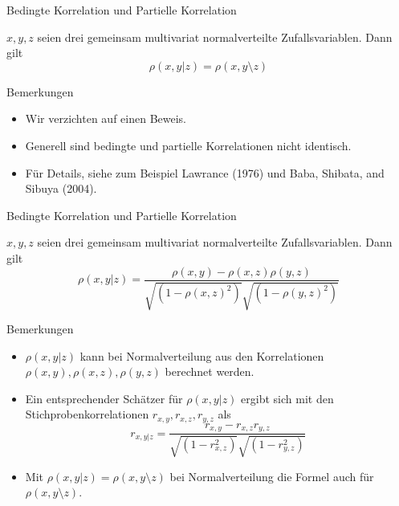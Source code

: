 \documentclass[
  8pt,
  ignorenonframetext,
]{beamer}
\providecommand{\tightlist}{%
  \setlength{\itemsep}{0pt}\setlength{\parskip}{0pt}}
\begin{document}
\begin{frame}{Bedingte Korrelation und Partielle Korrelation}
\protect\hypertarget{bedingte-korrelation-und-partielle-korrelation-8}{}
\small
\begin{theorem}
\justifying
\normalfont
$x,y,z$ seien drei gemeinsam multivariat normalverteilte Zufallsvariablen. Dann gilt
\begin{equation}
\rho(x,y|z) = \rho(x,y \setminus z)
\end{equation}
\end{theorem}
\footnotesize

Bemerkungen

\begin{itemize}
\tightlist
\item
  Wir verzichten auf einen Beweis.
\item
  Generell sind bedingte und partielle Korrelationen nicht identisch.
\item
  Für Details, siehe zum Beispiel Lawrance (1976) und Baba, Shibata, and
  Sibuya (2004).
\end{itemize}
\end{frame}

\begin{frame}{Bedingte Korrelation und Partielle Korrelation}
\protect\hypertarget{bedingte-korrelation-und-partielle-korrelation-9}{}
\small
\begin{theorem}
\justifying
\normalfont
$x,y,z$ seien drei gemeinsam multivariat normalverteilte Zufallsvariablen. Dann gilt
\begin{equation}
\rho(x,y|z) = \frac{\rho(x,y) - \rho(x,z)\rho(y,z)}{\sqrt{\left(1 - \rho(x,z)^2\right)}\sqrt{\left(1 - \rho(y,z)^2\right)}}
\end{equation}
\end{theorem}

\footnotesize

Bemerkungen

\begin{itemize}
\tightlist
\item
  \(\rho(x,y|z)\) kann bei Normalverteilung aus den Korrelationen
  \(\rho(x,y), \rho(x,z), \rho(y,z)\) berechnet werden.
\item
  Ein entsprechender Schätzer für \(\rho(x,y|z)\) ergibt sich mit den
  Stichprobenkorrelationen \(r_{x,y}, r_{x,z}, r_{y,z}\) als
  \begin{equation}
  r_{x,y|z} = \frac{r_{x,y} - r_{x,z}r_{y,z}}{\sqrt{(1 - r^2_{x,z})}\sqrt{(1 - r_{y,z}^2)}}
  \end{equation}
\item
  Mit \(\rho(x,y|z) = \rho(x,y \setminus z)\) bei Normalverteilung die
  Formel auch für \(\rho(x,y \setminus z)\).
\end{itemize}
\end{frame}
\end{document}
